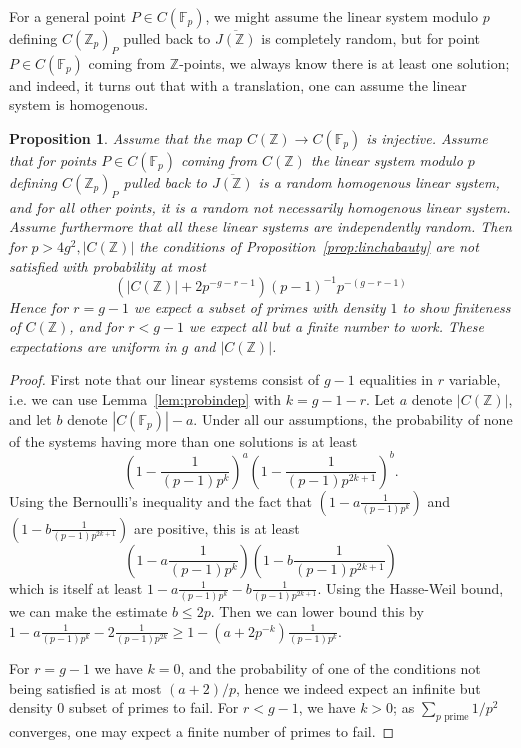 \documentclass[12pt]{article}
\newcommand{\Z}{\mathbb{Z}}
\newcommand{\F}{\mathbb{F}}
\theoremstyle{plain}
\newtheorem{prop}[thm]{Proposition} %
\theoremstyle{definition}
\theoremstyle{remark}
\begin{document}
For a general point $P \in C(\F_p)$, we might assume the linear system modulo $p$ defining $C(\Z_p)_P$ pulled back to $\overline{J(\Z)}$ is completely random, but for point $P \in C(\F_p)$ coming from $\Z$-points, we always know there is at least one solution; and indeed, it turns out that with a translation, one can assume the linear system is homogenous.
\begin{prop}
\label{prop:probwork}
Assume that the map $C(\Z) \to C(\F_p)$ is injective. Assume that for points $P \in C(\F_p)$ coming from $C(\Z)$ the linear system modulo $p$ defining $C(\Z_p)_P$ pulled back to $\overline{J(\Z)}$ is a random homogenous linear system, and for all other points, it is a random not necessarily homogenous linear system. Assume furthermore that all these linear systems are independently random. Then for $p > 4g^2,|C(\Z)|$ the conditions of Proposition~\ref{prop:linchabauty} are not satisfied with probability at most
\[
(|C(\Z)|+2p^{-g-r-1})(p-1)^{-1}p^{-(g-r-1)}
\]
Hence for $r = g-1$ we expect a subset of primes with density $1$ to show finiteness of $C(\Z)$, and for $r < g-1$ we expect all but a finite number to work. These expectations are uniform in $g$ and $|C(\Z)|$.
\end{prop}
\begin{proof}
First note that our linear systems consist of $g-1$ equalities in $r$ variable, i.e. we can use Lemma~\ref{lem:probindep} with $k = g-1-r$. Let $a$ denote $|C(\Z)|$, and let $b$ denote $|C(\F_p)|-a$. Under all our assumptions, the probability of none of the systems having more than one solutions is at least
\[
\left(1 - \frac{1}{(p-1)p^k}\right)^{a} \left(1 - \frac{1}{(p-1)p^{2k+1}}\right)^b.
\]
Using the Bernoulli's inequality and the fact that $\left(1- a\frac{1}{(p-1)p^k}\right)$ and $\left(1 - b\frac{1}{(p-1)p^{2k+1}}\right)$ are positive, this is at least 
\[
\left(1- a\frac{1}{(p-1)p^k}\right)\left(1 - b\frac{1}{(p-1)p^{2k+1}}\right)
\]
which is itself at least $1 - a\frac{1}{(p-1)p^k} - b\frac{1}{(p-1)p^{2k+1}}$. Using the Hasse-Weil bound, we can make the estimate $b \leq 2p$. Then we can lower bound this by $1 - a\frac{1}{(p-1)p^k} - 2\frac{1}{(p-1)p^{2k}} \geq 1 - (a+2p^{-k})\frac{1}{(p-1)p^k}$.

For $r = g-1$ we have $k= 0$, and the probability of one of the conditions not being satisfied is at most $(a+2)/p$, hence we indeed expect an infinite but density $0$ subset of primes to fail. For $r < g-1$, we have $k > 0$; as $\sum_{p\text{ prime}} 1/p^2$ converges, one may expect a finite number of primes to fail.
\end{proof}
\end{document}
